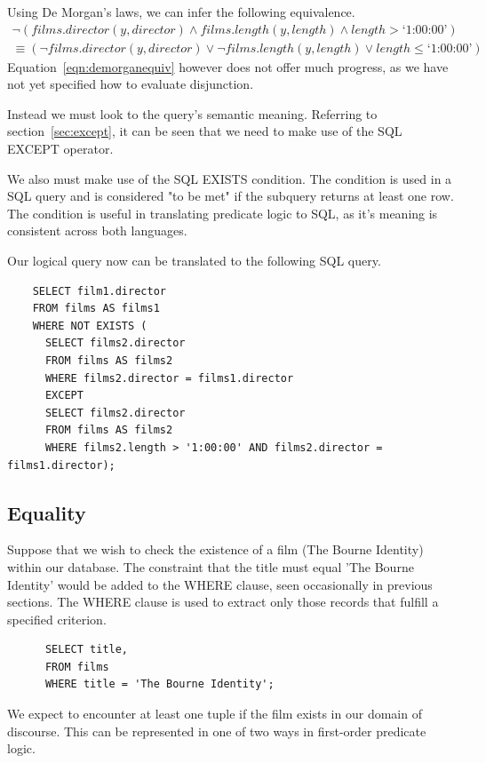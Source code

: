 \documentclass[a4paper, 11pt]{article}
\begin{document}
    Using De Morgan's laws, we can infer the following
    equivalence.
    \begin{multline}
      \label{eqn:demorganequiv}
      \lnot(films.director(y, director) \land films.length(y, length) 
      \land length > \text{`1:00:00'}) \\ \equiv (\lnot films.director(y,
      director) \lor \lnot films.length(y, length) \lor length \le \text{`1:00:00'})
    \end{multline}
    Equation~\ref{eqn:demorganequiv} however does not offer much progress, as
    we have not yet specified how to evaluate disjunction.

    Instead we must look to the query's semantic meaning. Referring to
    section~\ref{sec:except}, it can be seen that we need to make use of the
    SQL EXCEPT operator.

    We also must make use of the SQL EXISTS condition. The condition
    is used in a SQL query and is considered "to be met" if the subquery
    returns at least one row\cite{technetEXISTS}. The condition is useful in
    translating predicate logic to SQL, as it's meaning is consistent across
    both languages. 

    Our logical query now can be translated to the following SQL query.
    \begin{verbatim}
    SELECT film1.director
    FROM films AS films1
    WHERE NOT EXISTS (
      SELECT films2.director
      FROM films AS films2
      WHERE films2.director = films1.director
      EXCEPT
      SELECT films2.director
      FROM films AS films2
      WHERE films2.length > '1:00:00' AND films2.director = films1.director);
    \end{verbatim}

    \subsection{Equality}

      Suppose that we wish to check the existence of a film (The Bourne
      Identity) within our database. The constraint that the title must equal
      'The Bourne Identity' would be added to the WHERE clause, seen
      occasionally in previous sections. The WHERE clause is used to extract
      only those records that fulfill a specified criterion\cite{w3WHERE}.
      \begin{verbatim}
      SELECT title,
      FROM films
      WHERE title = 'The Bourne Identity';
      \end{verbatim}
      We expect to encounter at least one tuple if the film exists in our domain
      of discourse. This can be represented in one of two ways in first-order
      predicate logic.
\end{document}
